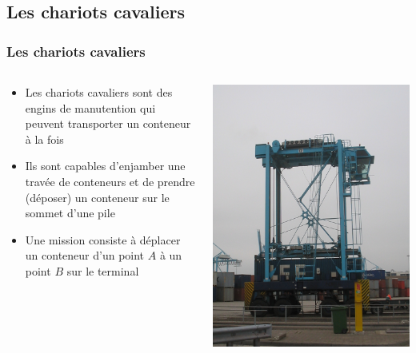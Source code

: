 \documentclass{beamer}
\begin{document}
\begin{frame}
\subsection*{Les chariots cavaliers} 
\frametitle{Les chariots cavaliers}
\begin{columns}
  \begin{column}[l]{8cm}
    \begin{itemize}
    \item Les chariots cavaliers sont des engins de manutention qui peuvent transporter un conteneur à la fois
    \item Ils sont capables d'enjamber une travée de conteneurs et de prendre (déposer) un conteneur sur le sommet d'une pile
    \item Une mission consiste à déplacer un conteneur d'un point $A$ à un point $B$ sur le terminal
    \end{itemize}
  \end{column}
  \begin{column}[r]{3cm}
	\begin{flushright}
	    \includegraphics[height=.5\textheight]{fig/Containerlift_straddle_carrier.jpg}
	\end{flushright}
  \end{column}
\end{columns}	
\end{frame}
\end{document}

